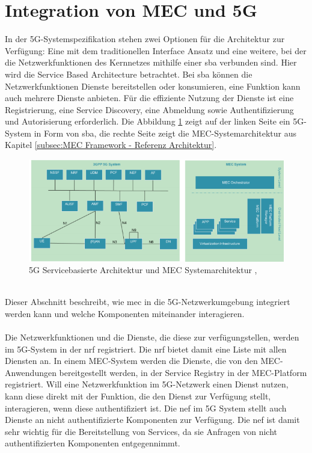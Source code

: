 \documentclass[runningheads]{llncs}
\numberwithin{figure}{section}
\begin{document}
\section{Integration von MEC und 5G}
In der 5G-Systemspezifikation stehen zwei Optionen für die Architektur zur Verfügung:
Eine mit dem traditionellen Interface Ansatz und eine weitere, 
bei der die Netzwerkfunktionen des Kernnetzes mithilfe einer \acrfull{sba} verbunden sind. 
Hier wird die Service Based Architecture betrachtet. Bei \acrshort{sba} können die Netzwerkfunktionen Dienste bereitstellen oder konsumieren, eine
Funktion kann auch mehrere Dienste anbieten. 
Für die effiziente Nutzung der Dienste 
ist eine Registrierung, eine Service Discovery, eine Abmeldung sowie Authentifizierung und Autorisierung erforderlich.
Die Abbildung \ref{fig:sba} zeigt auf der linken Seite ein 5G-System in Form von \acrshort{sba}, 
die rechte Seite zeigt die MEC-Systemarchitektur aus Kapitel \ref{subsec:MEC Framework - Referenz Architektur}.
\begin{figure}
  \includegraphics[width=\linewidth]{images/5GMEC-System-Architecture.png}
  \caption{5G Servicebasierte Architektur und MEC Systemarchitektur \cite{arnold5GRadioAccess2017} \cite{etsiETSIGSMEC}, \cite{etsiMultiaccessEdgeComputinga}}
  \label{fig:sba}
\end{figure}
\\
Dieser Abschnitt beschreibt, wie \acrfull{mec} in die 5G-Netzwerkumgebung integriert werden kann 
und welche Komponenten miteinander interagieren.
\\
\\
Die Netzwerkfunktionen und die Dienste, die diese zur verfügungstellen, werden im 5G-System in der \acrfull{nrf} registriert.
Die \acrshort{nrf} bietet damit eine Liste mit allen Diensten an. 
In einem MEC-System werden die Dienste, die von den MEC- Anwendungen bereitgestellt werden, in der Service Registry in der MEC-Platform registriert.
Will eine Netzwerkfunktion im 5G-Netzwerk einen Dienst nutzen, kann diese direkt mit der Funktion, die den Dienst zur Verfügung stellt, interagieren,
wenn diese au­then­ti­fi­zie­rt ist. Die \acrfull{nef} im 5G System stellt auch Dienste an nicht au­then­ti­fi­zie­rte Komponenten 
zur Verfügung. Die \acrshort{nef} ist damit sehr wichtig für die Bereitstellung von Services, da sie Anfragen von nicht authentifizierten Komponenten
entgegennimmt.
\\
\\
\end{document}
